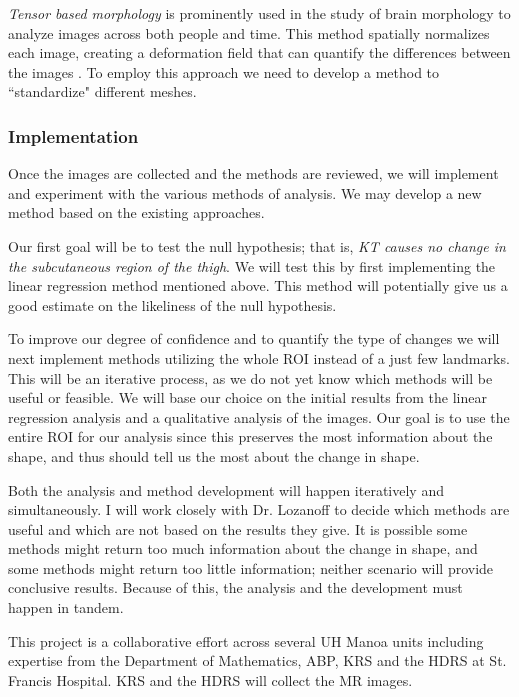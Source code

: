 \documentclass[letterpaper, 12 pt, conference]{ieeeconf}  %
\begin{document}
\emph{Tensor based morphology} is prominently used in the study of brain morphology to analyze images across both people and time.  This method spatially normalizes each image, creating a deformation field that can quantify the differences between the images \cite{Grossmann2002} \cite{Lepore2008}. To employ this approach we need to develop a method to ``standardize" different meshes.

\subsubsection{Implementation}

Once the images are collected and the methods are reviewed, we will implement and experiment with the various methods of analysis.  We may develop a new method based on the existing approaches. 

Our first goal will be to test the null hypothesis;  that is, \emph{KT causes no change in the subcutaneous region of the thigh}. We will test this by first implementing the linear regression method mentioned above.  This method will potentially give us a good estimate on the likeliness of the null hypothesis.

To improve our degree of confidence and to quantify the type of changes we will next implement methods utilizing the whole \ac{ROI} instead of a just few landmarks.  This will be an iterative process, as we do not yet know which methods will be useful or feasible.  We will base our choice on the initial results from the linear regression analysis and a qualitative analysis of the images.   Our goal is to use the entire \ac{ROI} for our analysis since this preserves the most information about the shape, and thus should tell us the most about the change in shape.  

Both the analysis and method development will happen iteratively and simultaneously.  I will work closely with Dr. Lozanoff to decide which methods are useful and which are not based on the results they give.  It is possible some methods might return too much information about the change in shape, and some methods might return too little information; neither scenario will provide conclusive results.  Because of this, the analysis and the development must happen in tandem.  


This project is a collaborative effort across several UH Manoa units including expertise from the Department of Mathematics, \ac{ABP}, \ac{KRS} and the \ac{HDRS} at St. Francis Hospital.   \ac{KRS} and the \ac{HDRS} will collect the MR images. 






\end{document}
